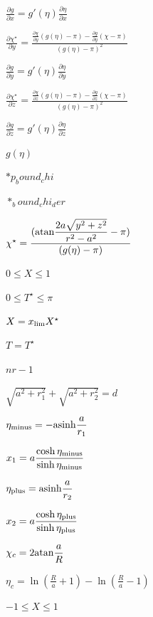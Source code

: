 \documentclass{article}
\begin{document}
$ \displaystyle\frac{\partial g}{\partial x} = g'(\eta) \displaystyle\frac{\partial \eta}{\partial x}$
\pagebreak

$ \displaystyle\frac{\partial \chi^\star}{\partial y} = \displaystyle\frac{\displaystyle\frac{\partial \chi}{\partial y}(g(\eta) - \pi) - \displaystyle\frac{\partial g}{\partial y}(\chi - \pi)}{(g(\eta)-\pi)^2} $
\pagebreak

$ \displaystyle\frac{\partial g}{\partial y} = g'(\eta) \displaystyle\frac{\partial \eta}{\partial y}$
\pagebreak

$ \displaystyle\frac{\partial \chi^\star}{\partial z} = \displaystyle\frac{\displaystyle\frac{\partial \chi}{\partial z}(g(\eta) - \pi) - \displaystyle\frac{\partial g}{\partial z}(\chi - \pi)}{(g(\eta)-\pi)^2} $
\pagebreak

$ \displaystyle\frac{\partial g}{\partial z} = g'(\eta) \displaystyle\frac{\partial \eta}{\partial z}$
\pagebreak

$ g(\eta) $
\pagebreak

$ *p_bound_chi $
\pagebreak

$ *_bound_chi_der $
\pagebreak

$ \chi^\star = \displaystyle\frac{({\rm atan} \displaystyle\frac{2a\sqrt{y^2+z^2}}{r^2-a^2}-\pi)} {(g(\eta) - \pi)} $
\pagebreak

$ 0 \leq X \leq 1 $
\pagebreak

$ 0 \leq T^\star \leq \pi $
\pagebreak

$ X = x_{\rm lim} X^\star $
\pagebreak

$ T = T^\star $
\pagebreak

$ nr-1 $
\pagebreak

$ \sqrt{a^2 + r_1^2} + \sqrt{a^2 + r_2^2} = d $
\pagebreak

$ \eta_{\rm minus} = -{\rm asinh}\displaystyle\frac{a}{r_1}$
\pagebreak

$ x_1 = a \displaystyle\frac{\cosh \eta_{\rm minus}}{\sinh \eta_{\rm minus}} $
\pagebreak

$ \eta_{\rm plus} = {\rm asinh}\displaystyle\frac{a}{r_2}$
\pagebreak

$ x_2 = a \displaystyle\frac{\cosh \eta_{\rm plus}}{\sinh \eta_{\rm plus}} $
\pagebreak

$ \chi_c = 2 {\rm atan}\displaystyle\frac{a}{R} $
\pagebreak

$ \eta_c = \ln (\displaystyle\frac{R}{a} + 1) - \ln (\displaystyle\frac{R}{a} - 1) $
\pagebreak

$ -1 \leq X \leq 1 $
\pagebreak
\end{document}
